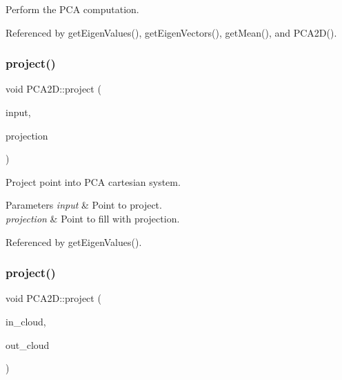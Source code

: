 Perform the P\+CA computation. 



Referenced by get\+Eigen\+Values(), get\+Eigen\+Vectors(), get\+Mean(), and P\+C\+A2\+D().

\mbox{\label{classPCA2D_a9768dbce5a3b9cd0b3aacbedc3301884}} 
\subsubsection{\texorpdfstring{project()}{project()}\hspace{0.1cm}{\footnotesize\ttfamily [1/2]}}
{\footnotesize\ttfamily void P\+C\+A2\+D\+::project (\begin{DoxyParamCaption}\item[{const \hyperlink{Normal2dEstimation_8h_ab8d898f36957cca40634530a6f118a3e}{Point} \&}]{input,  }\item[{\hyperlink{Normal2dEstimation_8h_ab8d898f36957cca40634530a6f118a3e}{Point} \&}]{projection }\end{DoxyParamCaption})}



Project point into P\+CA cartesian system. 


\begin{DoxyParams}{Parameters}
{\em input} & Point to project. \\
\hline
{\em projection} & Point to fill with projection. \\
\hline
\end{DoxyParams}


Referenced by get\+Eigen\+Values().

\mbox{\label{classPCA2D_ac36f8aacab8d6fe1d804f17cfa7b0f78}} 
\subsubsection{\texorpdfstring{project()}{project()}\hspace{0.1cm}{\footnotesize\ttfamily [2/2]}}
{\footnotesize\ttfamily void P\+C\+A2\+D\+::project (\begin{DoxyParamCaption}\item[{const \hyperlink{Normal2dEstimation_8h_a389a43addc496dc19a5bb0575cc60bc4}{Const\+Ptr\+Cloud} \&}]{in\+\_\+cloud,  }\item[{\hyperlink{Normal2dEstimation_8h_a2894055ff89c63cbae90e22dfddaa610}{Ptr\+Cloud} \&}]{out\+\_\+cloud }\end{DoxyParamCaption})}



